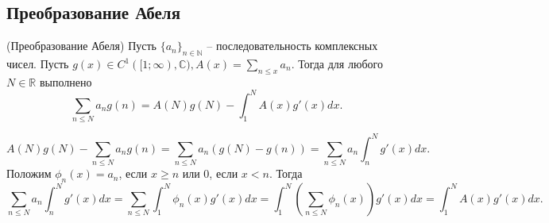 \subsection{Преобразование Абеля}
\begin{lemma}(Преобразование Абеля) \label{l3_Abel_transform}
	Пусть $\lbrace a_n \rbrace_{n \in \mathbb{N}}$ -- последовательность комплексных чисел. Пусть $\displaystyle g(x) \in C^1([1; \infty), \mathbb{C}), A(x) = \sum\limits_{n \leq x} a_n$. Тогда для любого $N \in \mathbb{R}$ выполнено
	$$\sum_{n \leq N} a_n g(n) = A(N) g(N) - \int_{1}^{N} A(x) g'(x) dx.$$
\end{lemma}
\begin{pf}
	$$A(N) g(N)- \sum_{n \leq N} a_n g(n) = \sum_{n \leq N} a_n (g(N) - g(n)) = \sum_{n \leq N} a_n \int_{n}^{N} g'(x) dx.$$
	Положим $\phi_n(x)= a_n$, если $x \geq n$ или 0, если $x < n$. Тогда
	$$\sum_{n \leq N} a_n \int_{n}^{N} g'(x) dx = \sum_{n \leq N} \int_{1}^{N} \phi_n(x) g'(x) dx = \int_{1}^{N} \left( \sum_{n \leq N} \phi_n(x) \right) g'(x) dx = \int_{1}^{N} A(x) g'(x) dx.$$
\end{pf}

